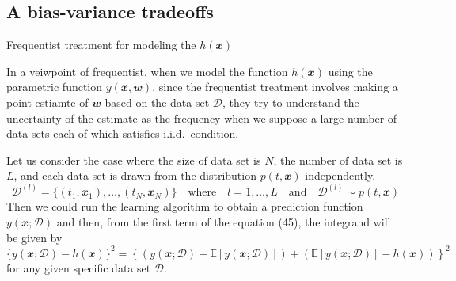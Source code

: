 \documentclass{bredelebeamer}
\begin{document}
\subsection{A bias-variance tradeoffs}
\begin{frame}{Frequentist treatment for modeling the $h(\mathbfit{x})$}
  \begin{justify}
    In a veiwpoint of frequentist, when we model the function $h(\mathbfit{x})$
    using the parametric function $y(\mathbfit{x}, \mathbfit{w})$, since the
    frequentist treatment involves making a point estiamte of $\mathbfit{w}$ based
    on the data set $\mathcal{D}$, they try to understand the uncertainty of
    the estimate as the frequency when we suppose a large number of data sets
    each of which satisfies i.i.d.\ condition.

    \vspace{0.5\baselineskip}
    Let us consider the case where the size of data set is $N$, the number of
    data set is $L$, and each data set is drawn from the distribution $p(t, \mathbfit{x})$
    independently.
    \begin{equation}
      \mathcal{D}^{(l)} = {\{(t_1,\mathbfit{x}_1), \ldots, (t_N,\mathbfit{x}_N)\}}
      \quad \textrm{where} \quad l = 1,\ldots,L \quad \textrm{and} \quad \mathcal{D}^{(l)} \sim p(t,\mathbfit{x})
    \end{equation}
    Then we could run the learning algorithm to obtain a prediction function
    $y(\mathbfit{x};\mathcal{D})$ and then, from the first term of the equation
    (45), the integrand will be given by
    \begin{equation}
      {\{y(\mathbfit{x};\mathcal{D}) - h(\mathbfit{x})\}}^2
      = {\left\{
      \left(y(\mathbfit{x};\mathcal{D}) - \mathbb{E}[y(\mathbfit{x};\mathcal{D})]\right)
      + \left(\mathbb{E}[y(\mathbfit{x};\mathcal{D})] - h(\mathbfit{x})\right)
      \right\}}^2
    \end{equation}
    for any given specific data set $\mathcal{D}$.
  \end{justify}
\end{frame}
\end{document}
